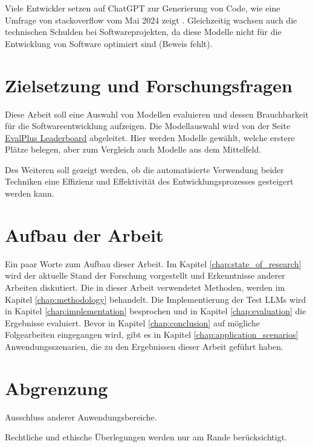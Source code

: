 Viele Entwickler setzen auf ChatGPT zur Generierung von Code, wie eine Umfrage von stackoverflow vom Mai 2024 zeigt \cite{noauthor_developers_2024}. Gleichzeitig wachsen auch die technischen Schulden bei Softwareprojekten, da diese Modelle nicht für die Entwicklung von Software optimiert sind (Beweis fehlt).\vspace{0.2cm}


\section{Zielsetzung und Forschungsfragen}
Diese Arbeit soll eine Auswahl von Modellen evaluieren und dessen Brauchbarkeit für die Softwareentwicklung aufzeigen. Die Modellauswahl wird von der Seite \href{https://evalplus.github.io/leaderboard.html}{EvalPlus Leaderboard} abgeleitet. Hier werden Modelle gewählt, welche erstere Plätze belegen, aber zum Vergleich auch Modelle aus dem Mittelfeld.\vspace{0.2cm}

Des Weiteren soll gezeigt werden, ob die automatisierte Verwendung beider Techniken eine Effizienz und Effektivität des Entwicklungsprozesses gesteigert werden kann.


\section{Aufbau der Arbeit}
Ein paar Worte zum Aufbau dieser Arbeit. Im Kapitel \ref{chap:state_of_research} wird der aktuelle Stand der Forschung vorgestellt und Erkenntnisse anderer Arbeiten diskutiert. Die in dieser Arbeit verwendetet Methoden, werden im Kapitel \ref{chap:methodology} behandelt. Die Implementierung der Test LLMs wird in Kapitel \ref{chap:implementation} besprochen und in Kapitel \ref{chap:evaluation} die Ergebnisse evaluiert. Bevor in Kapitel \ref{chap:conclusion} auf mögliche Folgearbeiten eingegangen wird, gibt es in Kapitel \ref{chap:application_scenarios} Anwendungsszenarien, die zu den Ergebnissen dieser Arbeit geführt haben.


\section{Abgrenzung}
Ausschluss anderer Anwendungsbereiche.

Rechtliche und ethische Überlegungen werden nur am Rande berücksichtigt.